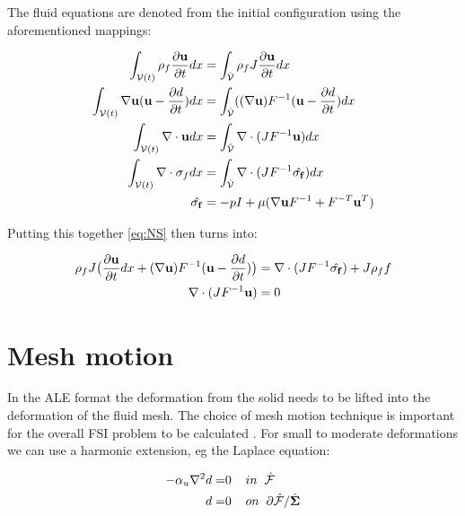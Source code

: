 The fluid equations are denoted from the initial configuration using the aforementioned mappings:

\begin{align}
\int_{\mathcal{V}(t)} \rho_f \frac{\partial \bold{u}}{\partial t} dx & = \int_{\hat{\mathcal{V}}}  \rho_f J \frac{\partial \bold{u}}{\partial t} dx \\
\int_{\mathcal{V}(t)} \nabla \bold{u} (\bold{u}-\frac{\partial d}{\partial t}) dx  &= \int_{\hat{\mathcal{V}}} ((\nabla \bold{u})F^{-1}(\bold{u}-\frac{\partial d}{\partial t}) dx  \\
\int_{\mathcal{V}(t)} \nabla \cdot \bold{u} dx  &=\int_{\hat{\mathcal{V}}}  \nabla \cdot (J F^{-1} \bold{u}  ) dx \\
\int_{\mathcal{V}(t)} \nabla \cdot \sigma_f dx &= \int_{\hat{\mathcal{V}}} \nabla \cdot( J F^{-1} \hat{\sigma_f} )     dx \\
\hat{\sigma_f} &= -pI + \mu ( \nabla \bold{u} F^{-1} + F^{-T} \bold{u}^{T}  ) 
\end{align}

Putting this together \eqref{eq:NS} then turns into:

\begin{align}
\label{eq:NS_mapped}
\rho_f J \big( \frac{\partial \bold{u}}{\partial t} dx + (\nabla \bold{u})F^{-1}(\bold{u}-\frac{\partial d}{\partial t}) \big) &= \nabla \cdot( J F^{-1} \hat{\sigma_f} ) + J \rho_f f \\
\nabla \cdot (J F^{-1} \bold{u} ) &= 0
\end{align} 

\section{Mesh motion}
In the ALE format the deformation from the solid needs to be lifted into the deformation of the fluid mesh. The choice of mesh motion technique is important for the overall FSI problem to be calculated \cite{Wick2011a}. For small to moderate deformations we can use a harmonic extension, eg the Laplace equation: 

\begin{align}
 - \alpha_u \nabla^2 d =& 0\hspace{4mm} in \hspace{2mm} \hat{\mathcal{F}}\\
  \hspace{4mm} d =& 0 \hspace{4mm } on \hspace{2mm }  \partial \hat{\mathcal{F}} / \hat{\Sigma}
\end{align}

